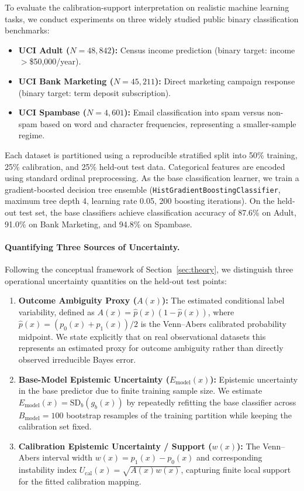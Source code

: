 \documentclass[11pt]{article}
\begin{document}
	To evaluate the calibration-support interpretation on realistic machine learning tasks, we conduct experiments on three widely studied public binary classification benchmarks:
	\begin{itemize}
		\item \textbf{UCI Adult ($N=48{,}842$):} Census income prediction (binary target: income $>$\$50{,}000/year).
		\item \textbf{UCI Bank Marketing ($N=45{,}211$):} Direct marketing campaign response (binary target: term deposit subscription).
		\item \textbf{UCI Spambase ($N=4{,}601$):} Email classification into spam versus non-spam based on word and character frequencies, representing a smaller-sample regime.
	\end{itemize}
	Each dataset is partitioned using a reproducible stratified split into 50\% training, 25\% calibration, and 25\% held-out test data. Categorical features are encoded using standard ordinal preprocessing. As the base classification learner, we train a gradient-boosted decision tree ensemble (\texttt{HistGradientBoostingClassifier}, maximum tree depth 4, learning rate 0.05, 200 boosting iterations). On the held-out test set, the base classifiers achieve classification accuracy of 87.6\% on Adult, 91.0\% on Bank Marketing, and 94.8\% on Spambase.

	\paragraph{Quantifying Three Sources of Uncertainty.}
	Following the conceptual framework of Section~\ref{sec:theory}, we distinguish three operational uncertainty quantities on the held-out test points:
	\begin{enumerate}
		\item \textbf{Outcome Ambiguity Proxy ($A(x)$):} The estimated conditional label variability, defined as $A(x) = \hat p(x)(1 - \hat p(x))$, where $\hat p(x) = (p_0(x) + p_1(x))/2$ is the Venn--Abers calibrated probability midpoint. We state explicitly that on real observational datasets this represents an estimated proxy for outcome ambiguity rather than directly observed irreducible Bayes error.
		\item \textbf{Base-Model Epistemic Uncertainty ($E_{\mathrm{model}}(x)$):} Epistemic uncertainty in the base predictor due to finite training sample size. We estimate $E_{\mathrm{model}}(x) = \mathrm{SD}_b(g_b(x))$ by repeatedly refitting the base classifier across $B_{\mathrm{model}} = 100$ bootstrap resamples of the training partition while keeping the calibration set fixed.
		\item \textbf{Calibration Epistemic Uncertainty / Support ($w(x)$):} The Venn--Abers interval width $w(x) = p_1(x) - p_0(x)$ and corresponding instability index $U_{\mathrm{cal}}(x) = \sqrt{A(x) w(x)}$, capturing finite local support for the fitted calibration mapping.
	\end{enumerate}
\end{document}
